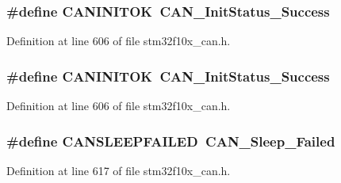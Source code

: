 \subsubsection[{\texorpdfstring{C\+A\+N\+I\+N\+I\+T\+OK}{CANINITOK}}]{\setlength{\rightskip}{0pt plus 5cm}\#define C\+A\+N\+I\+N\+I\+T\+OK~{\bf C\+A\+N\+\_\+\+Init\+Status\+\_\+\+Success}}\hypertarget{group___c_a_n___legacy_ga14cba0b5b506be73e2f45c732f8e54cb}{}\label{group___c_a_n___legacy_ga14cba0b5b506be73e2f45c732f8e54cb}


Definition at line 606 of file stm32f10x\+\_\+can.\+h.

\subsubsection[{\texorpdfstring{C\+A\+N\+I\+N\+I\+T\+OK}{CANINITOK}}]{\setlength{\rightskip}{0pt plus 5cm}\#define C\+A\+N\+I\+N\+I\+T\+OK~{\bf C\+A\+N\+\_\+\+Init\+Status\+\_\+\+Success}}\hypertarget{group___c_a_n___legacy_ga14cba0b5b506be73e2f45c732f8e54cb}{}\label{group___c_a_n___legacy_ga14cba0b5b506be73e2f45c732f8e54cb}


Definition at line 606 of file stm32f10x\+\_\+can.\+h.

\subsubsection[{\texorpdfstring{C\+A\+N\+S\+L\+E\+E\+P\+F\+A\+I\+L\+ED}{CANSLEEPFAILED}}]{\setlength{\rightskip}{0pt plus 5cm}\#define C\+A\+N\+S\+L\+E\+E\+P\+F\+A\+I\+L\+ED~{\bf C\+A\+N\+\_\+\+Sleep\+\_\+\+Failed}}\hypertarget{group___c_a_n___legacy_ga4d5e8e0c57febb024b30e5f24866a117}{}\label{group___c_a_n___legacy_ga4d5e8e0c57febb024b30e5f24866a117}


Definition at line 617 of file stm32f10x\+\_\+can.\+h.

